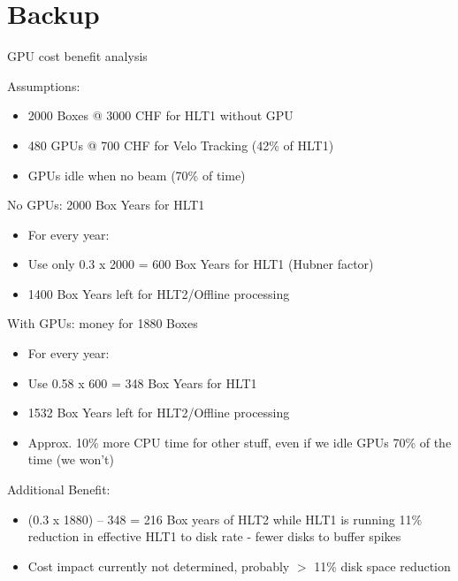 \section{Backup}

\begin{frame}{GPU cost benefit analysis}
\begin{tiny}
Assumptions:
\vspace{-10pt}
\begin{itemize}
\item 2000 Boxes @ 3000 CHF for HLT1 without GPU
\item 480 GPUs @ 700 CHF for Velo Tracking (42\% of HLT1) 
\item GPUs idle when no beam (70\% of time)
\end{itemize}

No GPUs: 2000 Box Years for HLT1
\vspace{-10pt}
\begin{itemize}
\item For every year:
\item Use only 0.3 x 2000 = 600 Box Years for HLT1 (Hubner factor)
\item 1400 Box Years left for HLT2/Offline processing
\end{itemize}

With GPUs: money for 1880 Boxes
\vspace{-10pt}
\begin{itemize}
\item For every year:
\item Use 0.58 x 600 = 348 Box Years for HLT1 
\item 1532 Box Years left for HLT2/Offline processing
\item Approx. 10\% more CPU time for other stuff, even if we idle GPUs 70\% of the time (we won’t)
\end{itemize}

Additional Benefit:
\vspace{-10pt}
\begin{itemize}
\item (0.3 x 1880) – 348 = 216 Box years of HLT2 while HLT1 is running
11\% reduction in effective HLT1 to disk rate - fewer disks to buffer spikes
\item Cost impact currently not determined, probably $>$ 11\% disk space reduction
\end{itemize}
\end{tiny}
\end{frame}


